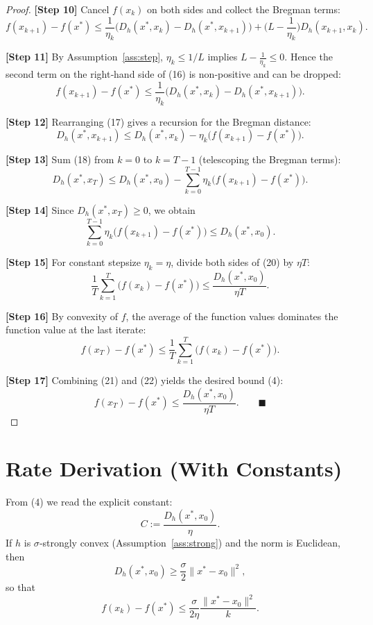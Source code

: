 \documentclass{article}
\newcommand{\D}[2]{D_{h}(#1,#2)}
\begin{document}
\begin{proof}
\noindent\textbf{[Step 10]} Cancel $f(x_k)$ on both sides and collect the Bregman terms:
\[
f(x_{k+1})-f(x^{*})
\le \frac{1}{\eta_k}\big(\D{x^{*}}{x_k}-\D{x^{*}}{x_{k+1}}\big)
+\Big(L-\frac{1}{\eta_k}\Big)\D{x_{k+1}}{x_k}. \tag{16}
\]

\noindent\textbf{[Step 11]} By Assumption~\ref{ass:step}, $\eta_k\le 1/L$ implies $L-\frac{1}{\eta_k}\le 0$.  
Hence the second term on the right‑hand side of (16) is non‑positive and can be dropped:
\[
f(x_{k+1})-f(x^{*})
\le \frac{1}{\eta_k}\big(\D{x^{*}}{x_k}-\D{x^{*}}{x_{k+1}}\big). \tag{17}
\]

\noindent\textbf{[Step 12]} Rearranging (17) gives a recursion for the Bregman distance:
\[
\D{x^{*}}{x_{k+1}}\le \D{x^{*}}{x_k}-\eta_k\big(f(x_{k+1})-f(x^{*})\big). \tag{18}
\]

\noindent\textbf{[Step 13]} Sum (18) from $k=0$ to $k=T-1$ (telescoping the Bregman terms):
\[
\D{x^{*}}{x_T}\le \D{x^{*}}{x_0}-\sum_{k=0}^{T-1}\eta_k\big(f(x_{k+1})-f(x^{*})\big). \tag{19}
\]

\noindent\textbf{[Step 14]} Since $\D{x^{*}}{x_T}\ge 0$, we obtain
\[
\sum_{k=0}^{T-1}\eta_k\big(f(x_{k+1})-f(x^{*})\big)\le \D{x^{*}}{x_0}. \tag{20}
\]

\noindent\textbf{[Step 15]} For constant stepsize $\eta_k=\eta$, divide both sides of (20) by $\eta T$:
\[
\frac{1}{T}\sum_{k=1}^{T}\big(f(x_{k})-f(x^{*})\big)
\le \frac{\D{x^{*}}{x_0}}{\eta T}. \tag{21}
\]

\noindent\textbf{[Step 16]} By convexity of $f$, the average of the function values dominates the function value at the last iterate:
\[
f(x_T)-f(x^{*})\le \frac{1}{T}\sum_{k=1}^{T}\big(f(x_{k})-f(x^{*})\big). \tag{22}
\]

\noindent\textbf{[Step 17]} Combining (21) and (22) yields the desired bound (4):
\[
f(x_T)-f(x^{*})\le \frac{\D{x^{*}}{x_0}}{\eta T}.
\qquad\blacksquare
\]
\end{proof}

\section*{Rate Derivation (With Constants)}
From (4) we read the explicit constant:
\[
\boxed{C:=\frac{\D{x^{*}}{x_0}}{\eta}}.
\]
If $h$ is $\sigma$‑strongly convex (Assumption~\ref{ass:strong}) and the norm is Euclidean, then
\[
\D{x^{*}}{x_0}\ge \frac{\sigma}{2}\|x^{*}-x_0\|^{2},
\]
so that
\[
f(x_k)-f(x^{*})\le \frac{\sigma}{2\eta}\frac{\|x^{*}-x_0\|^{2}}{k}.
\]
\end{document}
